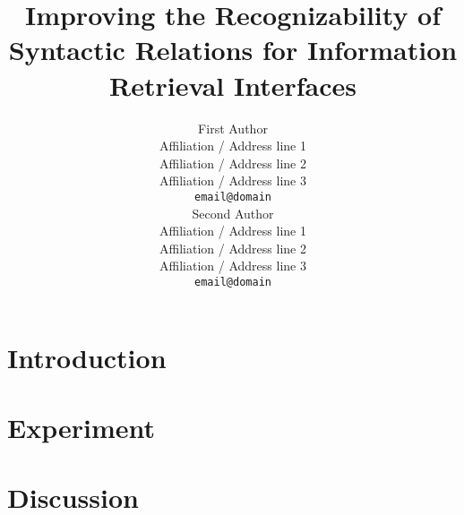 \documentclass[11pt]{article}
\title{Improving the Recognizability of Syntactic Relations for Information Retrieval Interfaces}
\author{First Author \\
  Affiliation / Address line 1 \\
  Affiliation / Address line 2 \\
  Affiliation / Address line 3 \\
  {\tt email@domain} \\\And
  Second Author \\
  Affiliation / Address line 1 \\
  Affiliation / Address line 2 \\
  Affiliation / Address line 3 \\
  {\tt email@domain} \\}
\begin{document}
\maketitle

\begin{abstract}

\end{abstract}



\section{Introduction}


%
\section{Experiment}


\section{Discussion}




\end{document}
